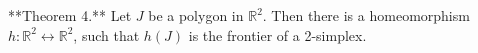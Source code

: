 **Theorem 4.** Let $J$ be a polygon in $\mathbb{R}^2$. Then there is a homeomorphism $h: \mathbb{R}^2 \leftrightarrow \mathbb{R}^2$, such that $h(J)$ is the frontier of a 2-simplex.
